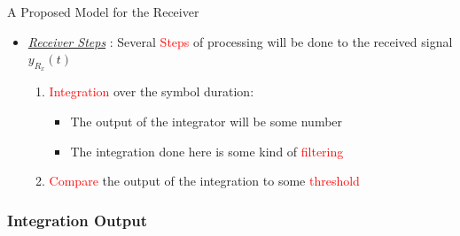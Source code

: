 \documentclass{Beamer}
\begin{document}
\begin{frame}[t,allowframebreaks]{A Proposed Model for the Receiver}
\begin{itemize}
\item \underline{\textit{Receiver Steps}} : Several \textcolor{red}{Steps} of processing will be done to the received signal $y_{R_x}(t)$

	\begin{enumerate}
	\item \textcolor{red}{Integration} over the symbol duration:
	
		\begin{itemize}
		\item The output of the integrator will be some number
		
		\item The integration done here is some kind of \textcolor{red}{filtering} 
		\end{itemize}
		
		\item \textcolor{red}{Compare} the output of the integration to 	some \textcolor{red}{threshold}
	\end{enumerate}

\end{itemize}


\end{frame}





\subsubsection{Integration Output}
\end{document}
